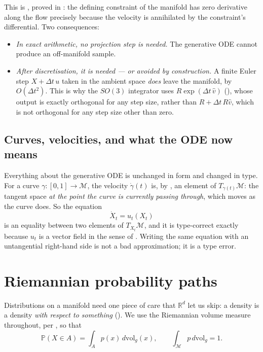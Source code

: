 \documentclass[11pt,a4paper]{report}
\theoremstyle{definition}
\theoremstyle{remark}
\newcommand{\RR}{\mathbb R}
\newcommand{\PP}{\mathbb P}
\begin{document}
This is , proved in : the
defining constraint of the manifold has zero derivative along the flow
precisely because the velocity is annihilated by the constraint's
differential. Two consequences:

\begin{itemize}
\item \emph{In exact arithmetic, no projection step is needed.} The
      generative ODE cannot produce an off-manifold sample.
\item \emph{After discretisation, it is needed --- or avoided by
      construction.} A finite Euler step $X+\Delta t\,u$ taken in the
      ambient space \emph{does} leave the manifold, by $O(\Delta t^2)$. This
      is why the $SO(3)$ integrator uses $R\exp(\Delta t\,\widehat v)$
      (), whose output is exactly orthogonal for
      any step size, rather than $R+\Delta t\,R\widehat v$, which is not
      orthogonal for any step size other than zero.
\end{itemize}

\subsection{Curves, velocities, and what the ODE now means}
\label{sec:rfm-curves}

Everything about the generative ODE is unchanged in form and changed in
type. For a curve $\gamma:[0,1]\to\mathcal M$, the velocity
$\dot\gamma(t)$ is, by , an element of
$T_{\gamma(t)}\mathcal M$: the tangent space \emph{at the point the curve is
currently passing through}, which moves as the curve does. So the equation
\[
\dot X_t = u_t(X_t)
\]
is an equality between two elements of $T_{X_t}\mathcal M$, and it is
type-correct exactly because $u_t$ is a vector field in the sense of
. Writing the same equation with an untangential
right-hand side is not a bad approximation; it is a type error.

\section{Riemannian probability paths}
\label{sec:rfm-paths}

Distributions on a manifold need one piece of care that $\RR^d$ let us skip:
a density is a density \emph{with respect to something}
(). We use the Riemannian volume measure
throughout, per , so that
\[
\PP(X\in A)=\int_Ap(x)\,d\mathrm{vol}_g(x),
\qquad
\int_{\mathcal M}p\,d\mathrm{vol}_g=1 .
\]
\end{document}
